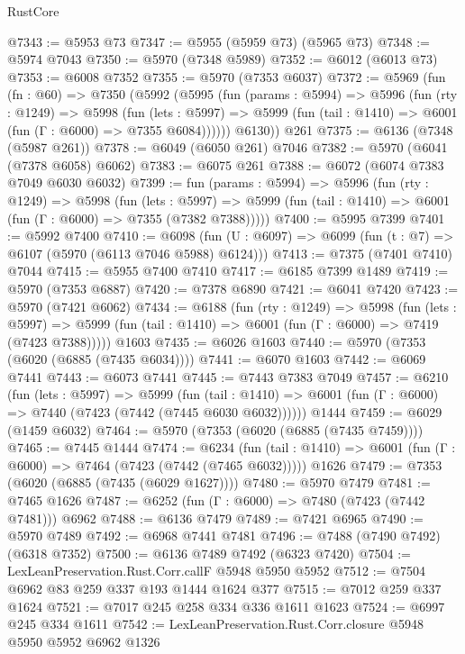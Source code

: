 \begin{lexlean}{RustCore}
\begin{coremodule}
{\begin{coremodule}
{{{{{{{{{{{{{{{{{{{{{{{{{{{{{{{{{{{{{{{{{{{{{@7343 := @5953 @73
@7347 := @5955 (@5959 @73) (@5965 @73)
@7348 := @5974 @7043
@7350 := @5970 (@7348 @5989)
@7352 := @6012 (@6013 @73)
@7353 := @6008 @7352
@7355 := @5970 (@7353 @6037)
@7372 := @5969
    (fun (fn : @60) =>
    @7350
      (@5992
        (@5995
          (fun (params : @5994) =>
          @5996
            (fun (rty : @1249) =>
            @5998
              (fun (lets : @5997) =>
              @5999 (fun (tail : @1410) => @6001 (fun (Γ : @6000) => @7355 @6084))))))
        @6130))
    @261
@7375 := @6136 (@7348 (@5987 @261))
@7378 := @6049 (@6050 @261) @7046
@7382 := @5970 (@6041 (@7378 @6058) @6062)
@7383 := @6075 @261
@7388 := @6072 (@6074 @7383 @7049 @6030 @6032)
@7399 := fun (params : @5994) =>
  @5996
    (fun (rty : @1249) =>
    @5998
      (fun (lets : @5997) =>
      @5999 (fun (tail : @1410) => @6001 (fun (Γ : @6000) => @7355 (@7382 @7388)))))
@7400 := @5995 @7399
@7401 := @5992 @7400
@7410 := @6098 (fun (U : @6097) => @6099 (fun (t : @7) => @6107 (@5970 (@6113 @7046 @5988) @6124)))
@7413 := @7375 (@7401 @7410) @7044
@7415 := @5955 @7400 @7410
@7417 := @6185 @7399 @1489
@7419 := @5970 (@7353 @6887)
@7420 := @7378 @6890
@7421 := @6041 @7420
@7423 := @5970 (@7421 @6062)
@7434 := @6188
    (fun (rty : @1249) =>
    @5998
      (fun (lets : @5997) =>
      @5999 (fun (tail : @1410) => @6001 (fun (Γ : @6000) => @7419 (@7423 @7388)))))
    @1603
@7435 := @6026 @1603
@7440 := @5970 (@7353 (@6020 (@6885 (@7435 @6034))))
@7441 := @6070 @1603
@7442 := @6069 @7441
@7443 := @6073 @7441
@7445 := @7443 @7383 @7049
@7457 := @6210
    (fun (lets : @5997) =>
    @5999
      (fun (tail : @1410) => @6001 (fun (Γ : @6000) => @7440 (@7423 (@7442 (@7445 @6030 @6032))))))
    @1444
@7459 := @6029 (@1459 @6032)
@7464 := @5970 (@7353 (@6020 (@6885 (@7435 @7459))))
@7465 := @7445 @1444
@7474 := @6234
    (fun (tail : @1410) => @6001 (fun (Γ : @6000) => @7464 (@7423 (@7442 (@7465 @6032)))))
    @1626
@7479 := @7353 (@6020 (@6885 (@7435 (@6029 @1627))))
@7480 := @5970 @7479
@7481 := @7465 @1626
@7487 := @6252 (fun (Γ : @6000) => @7480 (@7423 (@7442 @7481))) @6962
@7488 := @6136 @7479
@7489 := @7421 @6965
@7490 := @5970 @7489
@7492 := @6968 @7441 @7481
@7496 := @7488 (@7490 @7492) (@6318 @7352)
@7500 := @6136 @7489 @7492 (@6323 @7420)
@7504 := LexLeanPreservation.Rust.Corr.callF @5948 @5950 @5952
@7512 := @7504 @6962 @83 @259 @337 @193 @1444 @1624 @377
@7515 := @7012 @259 @337 @1624
@7521 := @7017 @245 @258 @334 @336 @1611 @1623
@7524 := @6997 @245 @334 @1611
@7542 := LexLeanPreservation.Rust.Corr.closure
    @5948
    @5950
    @5952
    @6962
    @1326
}}}}}}}}}}}}}}}}}}}}}}}}}}}}}}}}}}}}}}}}}}}}}
\end{coremodule}}
\end{coremodule}
\end{lexlean}
